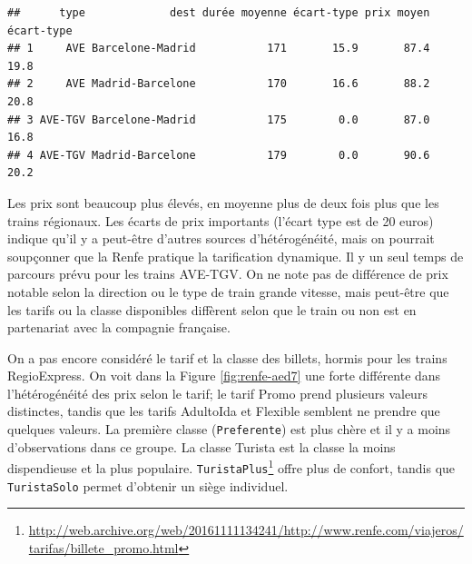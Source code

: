 \documentclass[
  11pt,
  letterpaper,
]{article}
\newenvironment{Shaded}{\begin{snugshade}}{\end{snugshade}}
\newcommand{\KeywordTok}[1]{\textcolor[rgb]{0.13,0.29,0.53}{\textbf{#1}}}
\newcommand{\NormalTok}[1]{#1}
\newcommand{\OperatorTok}[1]{\textcolor[rgb]{0.81,0.36,0.00}{\textbf{#1}}}
\newcommand{\StringTok}[1]{\textcolor[rgb]{0.31,0.60,0.02}{#1}}
\renewcommand{\href}[2]{#2\footnote{\url{#1}}}
\theoremstyle{definition}
\theoremstyle{definition}
\theoremstyle{definition}
\theoremstyle{remark}
\begin{document}
\begin{Shaded}
\end{Shaded}

\begin{verbatim}
##      type             dest durée moyenne écart-type prix moyen écart-type
## 1     AVE Barcelone-Madrid           171       15.9       87.4       19.8
## 2     AVE Madrid-Barcelone           170       16.6       88.2       20.8
## 3 AVE-TGV Barcelone-Madrid           175        0.0       87.0       16.8
## 4 AVE-TGV Madrid-Barcelone           179        0.0       90.6       20.2
\end{verbatim}

Les prix sont beaucoup plus élevés, en moyenne plus de deux fois plus que les trains régionaux. Les écarts de prix importants (l'écart type est de 20 euros) indique qu'il y a peut-être d'autres sources d'hétérogénéité, mais on pourrait soupçonner que la Renfe pratique la tarification dynamique. Il y un seul temps de parcours prévu pour les trains AVE-TGV. On ne note pas de différence de prix notable selon la direction ou le type de train grande vitesse, mais peut-être que les tarifs ou la classe disponibles diffèrent selon que le train ou non est en partenariat avec la compagnie française.

On a pas encore considéré le tarif et la classe des billets, hormis pour les trains RegioExpress. On voit dans la Figure \ref{fig:renfe-aed7} une forte différente dans l'hétérogénéité des prix selon le tarif; le tarif Promo prend plusieurs valeurs distinctes, tandis que les tarifs AdultoIda et Flexible semblent ne prendre que quelques valeurs. La première classe (\texttt{Preferente}) est plus chère et il y a moins d'observations dans ce groupe. La classe Turista est la classe la moins dispendieuse et la plus populaire. \href{http://web.archive.org/web/20161111134241/http://www.renfe.com/viajeros/tarifas/billete_promo.html}{\texttt{TuristaPlus}} offre plus de confort, tandis que \texttt{TuristaSolo} permet d'obtenir un siège individuel.
\end{document}
